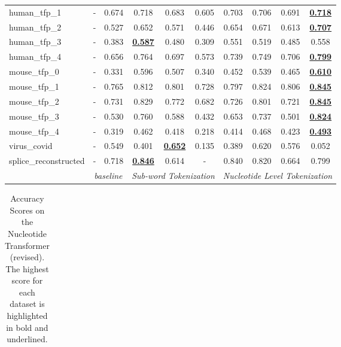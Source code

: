 \begin{table*}[h!]
\begin{center}
\begin{tabular}{l|cc|ccc|cccc}
human\_tfp\_1 & - & 0.674 & 0.718 & 0.683 & 0.605 & 0.703 & 0.706 & 0.691 & {\ul \textbf{0.718}} \\
human\_tfp\_2 & - & 0.527 & 0.652 & 0.571 & 0.446 & 0.654 & 0.671 & 0.613 & {\ul \textbf{0.707}} \\
human\_tfp\_3 & - & 0.383 & {\ul \textbf{0.587}} & 0.480 & 0.309 & 0.551 & 0.519 & 0.485 & 0.558 \\
human\_tfp\_4 & - & 0.656 & 0.764 & 0.697 & 0.573 & 0.739 & 0.749 & 0.706 & {\ul \textbf{0.799}} \\
mouse\_tfp\_0 & - & 0.331 & 0.596 & 0.507 & 0.340 & 0.452 & 0.539 & 0.465 & {\ul \textbf{0.610}} \\
mouse\_tfp\_1 & - & 0.765 & 0.812 & 0.801 & 0.728 & 0.797 & 0.824 & 0.806 & {\ul \textbf{0.845}} \\
mouse\_tfp\_2 & - & 0.731 & 0.829 & 0.772 & 0.682 & 0.726 & 0.801 & 0.721 & {\ul \textbf{0.845}} \\
mouse\_tfp\_3 & - & 0.530 & 0.760 & 0.588 & 0.432 & 0.653 & 0.737 & 0.501 & {\ul \textbf{0.824}} \\
mouse\_tfp\_4 & - & 0.319 & 0.462 & 0.418 & 0.218 & 0.414 & 0.468 & 0.423 & {\ul \textbf{0.493}} \\
virus\_covid & - & 0.549 & 0.401 & {\ul \textbf{0.652}} & 0.135 & 0.389 & 0.620 & 0.576 & 0.052 \\
splice\_reconstructed & - & 0.718 & {\ul \textbf{0.846}} & 0.614 & - & 0.840 & 0.820 & 0.664 & 0.799 \\
\hline
\multicolumn{1}{l|}{} & \multicolumn{2}{c|}{\textit{baseline}} & \multicolumn{3}{c|}{\textit{Sub-word Tokenization}} & \multicolumn{4}{c}{\textit{Nucleotide Level Tokenization}} \\ \hline
\end{tabular}
\end{center}
\end{table*}\begin{table*}[h!]
\small
\begin{center}
\caption{Accuracy Scores on the Nucleotide Transformer (revised). The highest score for each dataset is highlighted in bold and underlined.}
\label{table: NTv2 Results ACCURACY}
\begin{tabular}{l|cc|ccc|cccc}
\hline

\end{tabular}
\end{center}
\end{table*}
